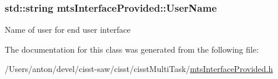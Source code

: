 \subsubsection[{User\+Name}]{\setlength{\rightskip}{0pt plus 5cm}std\+::string mts\+Interface\+Provided\+::\+User\+Name\hspace{0.3cm}{\ttfamily [protected]}}\label{classmts_interface_provided_a37bb4e89240cb1056a013d9aa9b1d2aa}
Name of user for end user interface 

The documentation for this class was generated from the following file\+:\begin{DoxyCompactItemize}
\item 
/\+Users/anton/devel/cisst-\/saw/cisst/cisst\+Multi\+Task/\hyperlink{mts_interface_provided_8h}{mts\+Interface\+Provided.\+h}\end{DoxyCompactItemize}
